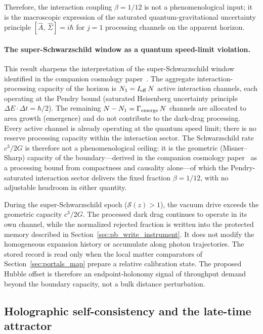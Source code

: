 \documentclass[aps,prd,twocolumn,10pt,superscriptaddress,nofootinbib]{revtex4-2}
\begin{document}
Therefore, the interaction coupling $\beta = 1/12$ is not a
phenomenological input; it is the macroscopic expression of the
saturated quantum-gravitational uncertainty principle
$[\hat{A},\,\hat{\Sigma}] = i\hbar$ for $j = 1$ processing
channels on the apparent horizon.

\paragraph{The super-Schwarzschild window as a quantum speed-limit
violation.}

This result sharpens the interpretation of the
super-Schwarzschild window identified in
the companion cosmology paper~\cite{Sayegh2026}.  The aggregate interaction-processing capacity of
the horizon is $N_1 = I_{\rm eff}\,N$ active interaction
channels, each operating at the Pendry bound (saturated Heisenberg
uncertainty principle $\Delta E \cdot \Delta t = \hbar/2$).
The remaining $N - N_1 = \Gamma_{\rm emerge}\,N$ channels are
allocated to area growth (emergence) and do not contribute to
the dark-drag processing.  Every active channel is already
operating at the quantum speed limit; there is no reserve
processing capacity within the interaction sector.  The Schwarzschild rate
$c^3/2G$ is therefore not a phenomenological ceiling: it is the
geometric (Misner--Sharp) capacity of the boundary---derived in
the companion cosmology paper~\cite{Sayegh2026} as a processing bound from compactness
and causality alone---of which the Pendry-saturated interaction
sector delivers the fixed fraction $\beta = 1/12$, with no
adjustable headroom in either quantity.

During the super-Schwarzschild epoch ($\mathcal{S}(z) > 1$), the
vacuum drive exceeds the geometric capacity $c^3/2G$.  The processed dark
drag continues to operate in its own channel, while the normalized rejected
fraction is written into the protected memory described in
Section~\ref{sec:pb_write_instrument}.  It does not modify the homogeneous
expansion history or accumulate along photon trajectories.  The stored
record is read only when the local matter comparators of
Section~\ref{sec:portals_map} prepare a relative calibration state.  The
proposed Hubble offset is therefore an endpoint-holonomy signal of
throughput demand beyond the boundary capacity, not a bulk distance
perturbation.

\subsection{Holographic self-consistency and the late-time
attractor}
\label{sec:self_consistency}
\end{document}
